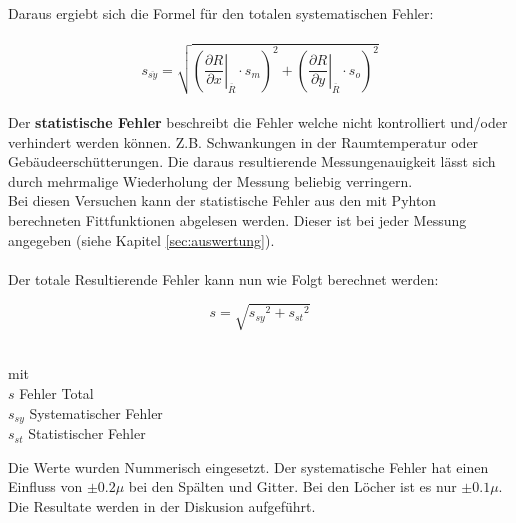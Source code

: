 Daraus ergiebt sich die Formel für den totalen systematischen Fehler:\\
\\
\begin{equation}
s_{\overline{sy}} = \sqrt{\left(\left. \frac{\partial R}{\partial x}\right|_{\overline{R}} \cdot s_m \right)^{2} + \left(\left. \frac{\partial R}{\partial y}\right|_{\overline{R}} \cdot s_o \right)^{2} }
\label{eq:fortpflanzungsgesetz}
\end{equation}
\\
Der \textbf{statistische Fehler} beschreibt die Fehler welche nicht kontrolliert und/oder verhindert werden können. Z.B. Schwankungen in der Raumtemperatur oder
Gebäudeerschütterungen. Die daraus resultierende Messungenauigkeit lässt
sich durch mehrmalige Wiederholung der Messung beliebig verringern.\\
Bei diesen Versuchen kann der statistische Fehler aus den mit Pyhton berechneten Fittfunktionen abgelesen werden. Dieser ist bei jeder Messung angegeben (siehe Kapitel \ref{sec:auswertung}).\\
\\
Der totale Resultierende Fehler kann nun wie Folgt berechnet werden:

\begin{equation}
s = \sqrt{{s_{sy}}^2 + {s_{st}}^2}
\label{eq:gesamtfehler}
\end{equation}

\begin{tabbing}
\hspace{40mm}			\=   \\
mit		\>					\\
$s$		\>  Fehler Total			\\
${s_{sy}}$	\> Systematischer Fehler		\\
${s_{st}}$ 	\> Statistischer Fehler			\\
\end{tabbing}

Die Werte wurden Nummerisch eingesetzt. Der systematische Fehler hat einen Einfluss von $\pm 0.2\mu$ bei den Spälten und Gitter. Bei den Löcher ist es nur $\pm 0.1\mu$. Die Resultate werden in der Diskusion aufgeführt.
